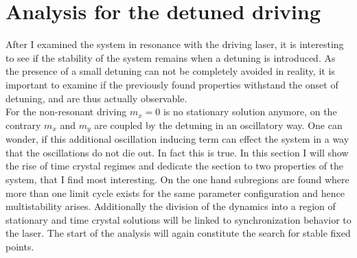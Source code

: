 \newpage
\section{Analysis for the detuned driving}\label{sec:detuned_analysis}%
After I examined the system in resonance with the driving laser, it is interesting to see if the stability of the system remains when a detuning is introduced. As the presence of a small detuning can not be completely avoided in reality, it is important to examine if the previously found properties withstand the onset of detuning, and are thus actually observable.\\
For the non-resonant driving $m_x=0$ is no stationary solution anymore, on the contrary $m_x$ and $m_y$ are coupled by the detuning in an oscillatory way. One can wonder, if this additional oscillation inducing term can effect the system in a way that the oscillations do not die out. In fact this is true. In this section I will show the rise of time crystal regimes and dedicate the section to two properties of the system, that I find most interesting. On the one hand subregions are found where more than one limit cycle exists for the same parameter configuration and hence multistability arises. Additionally the division of the dynamics into a region of stationary and time crystal solutions will be linked to synchronization behavior to the laser. The start of the analysis will again constitute the search for stable fixed points.


